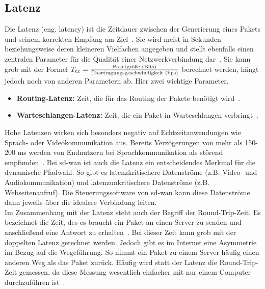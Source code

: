 \subsection*{Latenz}
Die Latenz (eng. latency) ist die Zeitdauer zwischen der Generierung eines Pakets und seinem korrekten Empfang am Ziel~\cite{jiangLowlatencyNetworkingWhere2018}. Sie wird meist in Sekunden beziehungsweise deren kleineren Vielfachen angegeben und stellt ebenfalls einen zentralen Parameter für die Qualität einer Netzwerkverbindung dar~\cite{kuroseComputernetzwerkeTopDownAnsatz2014}. Sie kann grob mit der Formel $T_{tx} = \frac{\textnormal{Paketgröße (Bits)}}{\textnormal{Übertragungsgeschwindigkeit (bps)}}$ berechnet werden, hängt jedoch noch von anderen Parametern ab. Hier zwei wichtige Parameter. 
\begin{itemize}
	\item \textbf{Routing-Latenz:} Zeit, die für das Routing der Pakete benötigt wird~\cite[5]{jiangLowlatencyNetworkingWhere2018}.
	\item \textbf{Warteschlangen-Latenz:} Zeit, die ein Paket in Warteschlangen verbringt~\cite[5]{jiangLowlatencyNetworkingWhere2018}.
\end{itemize}
Hohe Latenzen wirken sich besonders negativ auf Echtzeitanwendungen wie Sprach- oder Videokommunikation aus. Bereits Verzögerungen von mehr als 150-200 ms werden von Endnutzern bei Sprachkommunikation als störend empfunden~\cite{forouzanDataCommunicationsNetworking2012}. Bei \ac{sd-wan} ist auch die Latenz ein entscheidendes Merkmal für die dynamische Pfadwahl. So gibt es latenzkritischere Datenströme (z.B. Video- und Audiokommunikation) und latenzunkritischere Datenströme (z.B. Webseitenaufruf). Die Steuerungssoftware von \ac{sd-wan} kann diese Datenströme dann jeweils über die idealere Verbindung leiten. \\
Im Zusammenhang mit der Latenz steht auch der Begriff der Round-Trip-Zeit. Es bezeichnet die Zeit, des es braucht ein Paket an einen Server zu senden und anschließend eine Antwort zu erhalten~\cite{DefinitionRTTWas}. Bei dieser Zeit kann grob mit der doppelten Latenz gerechnet werden. Jedoch gibt es im Internet eine Asymmetrie im Bezug auf die Wegeführung. So nimmt ein Paket zu einem Server häufig einen anderen Weg als das Paket zurück. Häufig wird statt der Latenz die Round-Trip-Zeit gemessen, da diese Messung wesentlich einfacher mit nur einem Computer durchzuführen ist~\cite{DefinitionRTTWas}.

